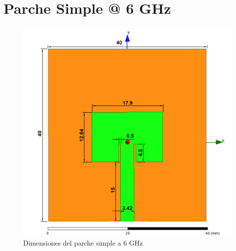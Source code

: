 \section{Parche Simple @ 6 GHz}
\vfill
\begin{figure}[H]
   	 \centering
        \includegraphics[width=\textwidth, height=\textheight, keepaspectratio=true]{archivos/desarrollo/autocad/2}
        \caption{Dimensiones del parche simple a 6 GHz}
        \label{fig:simple2}
\end{figure}
\vfill
\newpage

